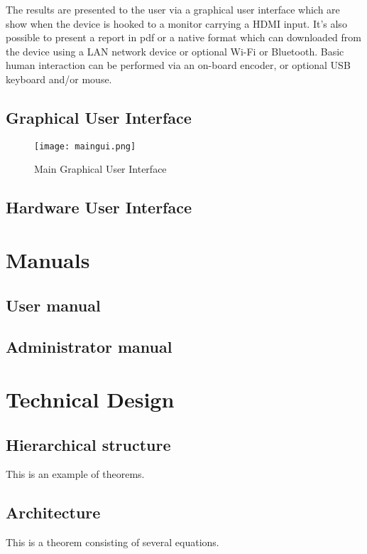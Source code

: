 \documentclass[11pt,fleqn,,a4paper,twoside,openright]{book}
\begin{document}
The results are presented to the user via a graphical user interface which are show when the device is hooked to a monitor carrying a HDMI input. It’s also possible to present a report in pdf or a native format which can downloaded from the device using a LAN network device or optional Wi-Fi or Bluetooth. Basic human interaction can be performed via an on-board encoder, or optional USB keyboard and/or mouse.

\section{Graphical User Interface}

\begin{figure}[h]
	\texttt{[image: maingui.png]}
	\caption{Main Graphical User Interface}
\end{figure}

\section{Hardware User Interface}

\chapter{Manuals}\label{manuals}

\section{User manual}

\section{Administrator manual}

\chapter{Technical Design}

\section{Hierarchical structure} 

This is an example of theorems.

\section{Architecture} 
This is a theorem consisting of several equations.
\end{document}
